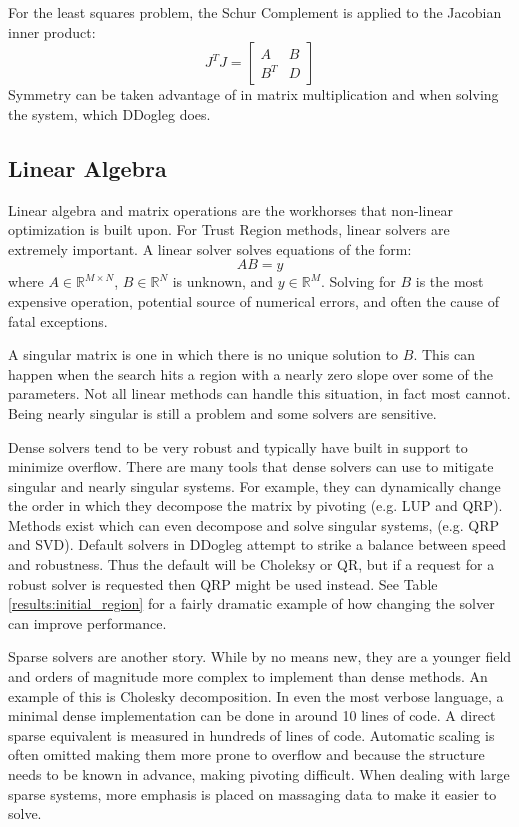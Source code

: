 \documentclass[peerreview,compsoc,onecolumn]{IEEEtran}
\newcommand{\R}{\mathbb{R}}
\begin{document}
For the least squares problem, the Schur Complement is applied to the Jacobian inner product:
\begin{equation}
J^T J =
\begin{bmatrix}
A & B \\
B^T & D
\end{bmatrix}
\end{equation}
Symmetry can be taken advantage of in matrix multiplication and when solving the system, which DDogleg does.

\subsection{Linear Algebra}

Linear algebra and matrix operations are the workhorses that non-linear optimization is built upon. For Trust Region methods, linear solvers are extremely important. A linear solver solves equations of the form:
\begin{equation}
AB = y
\end{equation}
where $A \in \R^{M \times N}$, $B \in \R^N$ is unknown, and $y \in \R^M$. Solving for $B$ is the most expensive operation, potential source of numerical errors, and often the cause of fatal exceptions.

A singular matrix is one in which there is no unique solution to $B$. This can happen when the search hits a region with a nearly zero slope over some of the parameters. Not all linear methods can handle this situation, in fact most cannot. Being nearly singular is still a problem and some solvers are sensitive.

Dense solvers tend to be very robust and typically have built in support to minimize overflow. There are many tools that dense solvers can use to mitigate singular and nearly singular systems. For example, they can dynamically change the order in which they decompose the matrix by pivoting (e.g. LUP and QRP). Methods exist which can even decompose and solve singular systems, (e.g. QRP and SVD). Default solvers in DDogleg attempt to strike a balance between speed and robustness. Thus the default will be Choleksy or QR, but if a request for a robust solver is requested then QRP might be used instead. See Table \ref{results:initial_region} for a fairly dramatic example of how changing the solver can improve performance.

Sparse solvers are another story. While by no means new, they are a younger field and orders of magnitude more complex to implement than dense methods. An example of this is Cholesky decomposition. In even the most verbose language, a minimal dense implementation can be done in around 10 lines of code. A direct sparse equivalent is measured in hundreds of lines of code. Automatic scaling is often omitted making them more prone to overflow and because the structure needs to be known in advance, making pivoting difficult. When dealing with large sparse systems, more emphasis is placed on massaging data to make it easier to solve. 
\end{document}
